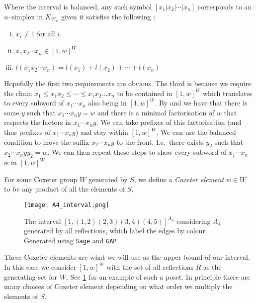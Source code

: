 \documentclass[class=article, crop=false]{standalone}
\begin{document}
Where the interval is balanced, any such symbol  $[x_1 | x_2 | \cdots | x_n]$ corresponds to an $n$--simplex in $K_{W_w}$ given it satisfies the following \cite{paolini_salvetti_kpi1_2021}:
\begin{enumerate}[i)]
    \item \label{item:interval_complex_requirement_1} $x_i \neq 1$ for all $i$.
    \item \label{item:interval_complex_requirement_2} $x_1 x_2 \cdots x_n \in [1,w]^W$
    \item \label{item:interval_complex_requirement_3} $l(x_1x_2\cdots x_n) = l(x_1) + l(x_2) + \cdots + l(x_n)$ 
\end{enumerate}
Hopefully the first two requirements are obvious. The third is because we require the chain $x_1 \leq x_1x_2 \leq \cdots \leq x_1x_2\ldots x_{n}$ to be contained in $[1,w]^W$ which translates to every subword of $x_1\cdots x_n$ also being in $[1,w]^W$. By  and  we have that there is some $y$ such that $x_1 \cdots x_n y = w$ and there is a minimal factorisation of $w$ that respects the factors in $ x_1 \cdots x_n y$. We can take prefixes of this factorisation (and thus prefixes of $ x_1 \cdots x_n y$) and stay within $[1,w]^W$. We can use the balanced condition to move the suffix $x_2\cdots x_n y$ to the front. I.e.~there exists $y_2$ such that $x_2\cdots x_n yy_2=w$. We can then repeat these steps to show every subword of $x_1 \cdots x_n $ is in $[1,w]^W$.

\begin{definition}
	For some Coxeter group $W$ generated by $S$, we define a \emph{Coxeter element} $w\in W$ to be any product of all the elements of $S$.
\end{definition}

\begin{figure}
	\centering
	\texttt{[image: A4\_interval.png]}
	\caption{The interval $[1, (1,2)(2,3)(3,4)(4,5)]^{A_4}$ considering $A_4$ generated by all reflections, which label the edges by colour. Generated using \texttt{Sage} and \texttt{GAP} \cite{sagemath_2020, gap_2022}}
	\label{fig:A4_interval}
\end{figure}

These Coxeter elements are what we will use as the upper bound of our interval. In this case we consider $[1,w]^W$ with the set of all reflections $R$ as the generating set for $W$. See \cref{fig:A4_interval} for an example of such a poset. In principle there are many choices of Coxeter element depending on what order we multiply the elements of $S$. 
\end{document}
